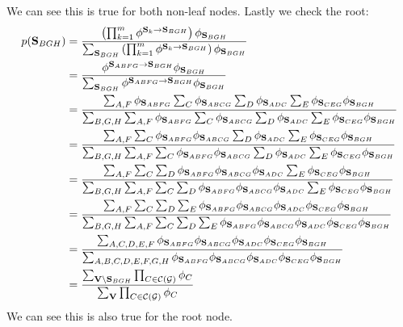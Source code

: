 \documentclass[11pt]{article}
\renewcommand{\vec}[1]{\mathbf{#1}}
\begin{document}
\begin{answertext}{23cm}{}
We can see this is true for both non-leaf nodes. Lastly we check the root:
\begin{align*}
p(\vec{S}_{BGH}) &=
\frac{
\left( \prod_{k=1}^m \phi^{\vec{S}_k \to \vec{S}_{BGH}} \right) \phi_{\vec{S}_{BGH}}
}{
\sum_{\vec{S}_{BGH}} \left( \prod_{k=1}^m \phi^{\vec{S}_k \to \vec{S}_{BGH}} \right) \phi_{\vec{S}_{BGH}}
}\\
&=\frac{\phi^{\vec{S}_{ABFG} \to \vec{S}_{BGH}}\phi_{\vec{S}_{BGH}}}
{\sum_{\vec{S}_{BGH}}\phi^{\vec{S}_{ABFG} \to \vec{S}_{BGH}}\phi_{\vec{S}_{BGH}}}\\
&=\frac{\sum_{A,F} \phi_{\vec{S}_{ABFG}}\sum_{C}\phi_{\vec{S}_{ABCG}}\sum_{D}\phi_{\vec{S}_{ADC}}\sum_{E}\phi_{\vec{S}_{CEG}}\phi_{\vec{S}_{BGH}}}
{\sum_{B,G,H}\sum_{A,F} \phi_{\vec{S}_{ABFG}}\sum_{C}\phi_{\vec{S}_{ABCG}}\sum_{D}\phi_{\vec{S}_{ADC}}\sum_{E}\phi_{\vec{S}_{CEG}}\phi_{\vec{S}_{BGH}}}\\
&=\frac{\sum_{A,F}\sum_{C} \phi_{\vec{S}_{ABFG}}\phi_{\vec{S}_{ABCG}}\sum_{D}\phi_{\vec{S}_{ADC}}\sum_{E}\phi_{\vec{S}_{CEG}}\phi_{\vec{S}_{BGH}}}
{\sum_{B,G,H}\sum_{A,F}\sum_{C} \phi_{\vec{S}_{ABFG}}\phi_{\vec{S}_{ABCG}}\sum_{D}\phi_{\vec{S}_{ADC}}\sum_{E}\phi_{\vec{S}_{CEG}}\phi_{\vec{S}_{BGH}}}\\
&=\frac{\sum_{A,F}\sum_{C}\sum_{D} \phi_{\vec{S}_{ABFG}}\phi_{\vec{S}_{ABCG}}\phi_{\vec{S}_{ADC}}\sum_{E}\phi_{\vec{S}_{CEG}}\phi_{\vec{S}_{BGH}}}
{\sum_{B,G,H}\sum_{A,F}\sum_{C}\sum_{D} \phi_{\vec{S}_{ABFG}}\phi_{\vec{S}_{ABCG}}\phi_{\vec{S}_{ADC}}\sum_{E}\phi_{\vec{S}_{CEG}}\phi_{\vec{S}_{BGH}}}\\
&=\frac{\sum_{A,F}\sum_{C}\sum_{D}\sum_{E} \phi_{\vec{S}_{ABFG}}\phi_{\vec{S}_{ABCG}}\phi_{\vec{S}_{ADC}}\phi_{\vec{S}_{CEG}}\phi_{\vec{S}_{BGH}}}
{\sum_{B,G,H}\sum_{A,F}\sum_{C}\sum_{D} \sum_{E}\phi_{\vec{S}_{ABFG}}\phi_{\vec{S}_{ABCG}}\phi_{\vec{S}_{ADC}}\phi_{\vec{S}_{CEG}}\phi_{\vec{S}_{BGH}}}\\
&=\frac{\sum_{A,C,D,E,F}\phi_{\vec{S}_{ABFG}}\phi_{\vec{S}_{ABCG}}\phi_{\vec{S}_{ADC}}\phi_{\vec{S}_{CEG}}\phi_{\vec{S}_{BGH}}}
{\sum_{A,B,C,D,E,F,G,H}\phi_{\vec{S}_{ABFG}}\phi_{\vec{S}_{ABCG}}\phi_{\vec{S}_{ADC}}\phi_{\vec{S}_{CEG}}\phi_{\vec{S}_{BGH}}}\\
&=
\frac{
\sum_{\vec{V} \setminus \vec{S}_{BGH}} \prod_{C \in {\cal C}({\cal G})} \phi_C
}{
\sum_{\vec{V}} \prod_{C \in {\cal C}({\cal G})} \phi_C
}
\end{align*}
We can see this is also true for the root node.
\end{answertext}


\end{document}
